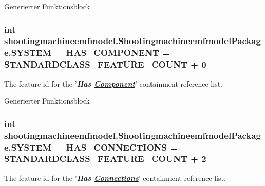 Generierter Funktionsblock  \hypertarget{interfaceshootingmachineemfmodel_1_1_shootingmachineemfmodel_package_a06b9c8fcde2110ea0af01f4164c5049f}{
\subsubsection[{S\-Y\-S\-T\-E\-M\-\_\-\-\_\-\-H\-A\-S\-\_\-\-C\-O\-M\-P\-O\-N\-E\-N\-T}]{\setlength{\rightskip}{0pt plus 5cm}int shootingmachineemfmodel.\-Shootingmachineemfmodel\-Package.\-S\-Y\-S\-T\-E\-M\-\_\-\-\_\-\-H\-A\-S\-\_\-\-C\-O\-M\-P\-O\-N\-E\-N\-T = {\bf S\-T\-A\-N\-D\-A\-R\-D\-C\-L\-A\-S\-S\-\_\-\-F\-E\-A\-T\-U\-R\-E\-\_\-\-C\-O\-U\-N\-T} + 0}}\label{interfaceshootingmachineemfmodel_1_1_shootingmachineemfmodel_package_a06b9c8fcde2110ea0af01f4164c5049f}
The feature id for the '{\itshape {\bfseries Has \hyperlink{interfaceshootingmachineemfmodel_1_1_component}{Component}}}' containment reference list.

Generierter Funktionsblock  \hypertarget{interfaceshootingmachineemfmodel_1_1_shootingmachineemfmodel_package_abdf9b98006657cc94bd60a69a57ac76d}{
\subsubsection[{S\-Y\-S\-T\-E\-M\-\_\-\-\_\-\-H\-A\-S\-\_\-\-C\-O\-N\-N\-E\-C\-T\-I\-O\-N\-S}]{\setlength{\rightskip}{0pt plus 5cm}int shootingmachineemfmodel.\-Shootingmachineemfmodel\-Package.\-S\-Y\-S\-T\-E\-M\-\_\-\-\_\-\-H\-A\-S\-\_\-\-C\-O\-N\-N\-E\-C\-T\-I\-O\-N\-S = {\bf S\-T\-A\-N\-D\-A\-R\-D\-C\-L\-A\-S\-S\-\_\-\-F\-E\-A\-T\-U\-R\-E\-\_\-\-C\-O\-U\-N\-T} + 2}}\label{interfaceshootingmachineemfmodel_1_1_shootingmachineemfmodel_package_abdf9b98006657cc94bd60a69a57ac76d}
The feature id for the '{\itshape {\bfseries Has \hyperlink{interfaceshootingmachineemfmodel_1_1_connections}{Connections}}}' containment reference list.

